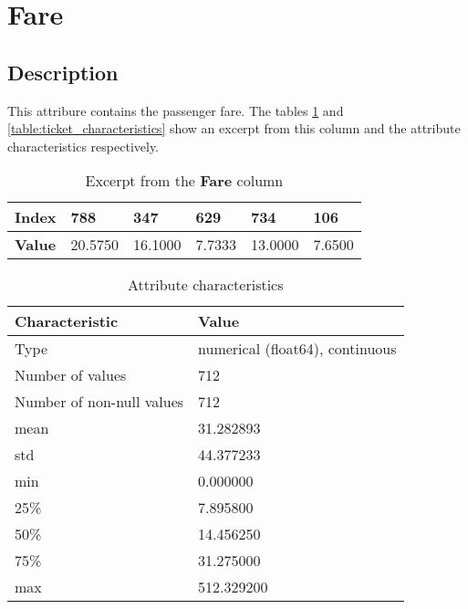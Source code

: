 \section{Fare} \label{section:Fare}
\subsection{Description}
This attribure contains the passenger fare. The tables 
\ref{table:fare_head} and \ref{table:ticket_characteristics} show an 
excerpt from this column and the attribute characteristics respectively.

\begin{table}[!ht]
    \centering
    \caption{Excerpt from the \textbf{Fare} column}
    \begin{tabular}{|l|l|l|l|l|l|}
        \hline
        \textbf{Index} & 788     & 347     & 629    & 734     & 106    \\ \hline
        \textbf{Value} & 20.5750 & 16.1000 & 7.7333 & 13.0000 & 7.6500 \\ \hline
    \end{tabular}
    \label{table:fare_head}
\end{table}

\begin{table}[!ht]
    \centering
    \caption{Attribute characteristics}
    \begin{tabular}{|l|l|}
        \hline
        \textbf{Characteristic}   & \textbf{Value}                  \\ \hline
        Type                      & numerical (float64), continuous \\ \hline
        Number of values          & 712                             \\ \hline
        Number of non-null values & 712                             \\ \hline
        mean                      &  31.282893                      \\ \hline
        std                       &  44.377233                      \\ \hline
        min                       &   0.000000                      \\ \hline
        25\%                      &   7.895800                      \\ \hline
        50\%                      &  14.456250                      \\ \hline
        75\%                      &  31.275000                      \\ \hline
        max                       & 512.329200                      \\ \hline
    \end{tabular}
    \label{table:fare_characteristics}
\end{table}


